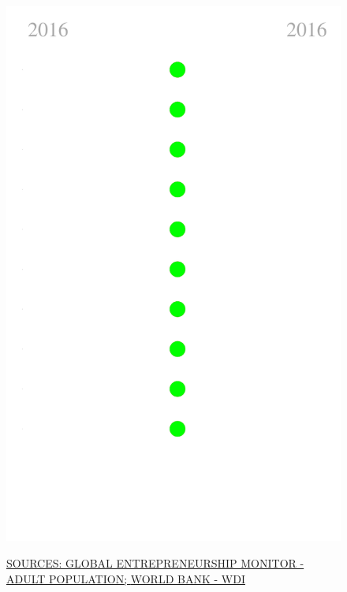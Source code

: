 \documentclass{article}\usepackage[]{graphicx}\usepackage[]{color}
\makeatletter
\def\maxwidth{ %
  \ifdim\Gin@nat@width>\linewidth
    \linewidth
  \else
    \Gin@nat@width
  \fi
}
\makeatother
\begin{document}
\begin{figure}
\begin{minipage}[c]{0.95\textwidth}
\begin{minipage}[c]{0.125\textwidth}
{\centering \includegraphics[width=\maxwidth]{figure/sparklines_Culture-1} 

}



    \vspace*{-0.5cm}
  \end{minipage}
  
  \scriptsize{\href{http://www.gemconsortium.org/data/sets}{\textcolor[HTML]{22A6F5}{SOURCES: GLOBAL ENTREPRENEURSHIP MONITOR - ADULT POPULATION; }}\href{http://data.worldbank.org}{\textcolor[HTML]{22A6F5}{WORLD BANK - WDI}}}
  

\end{minipage}
\end{figure}
\end{document}
